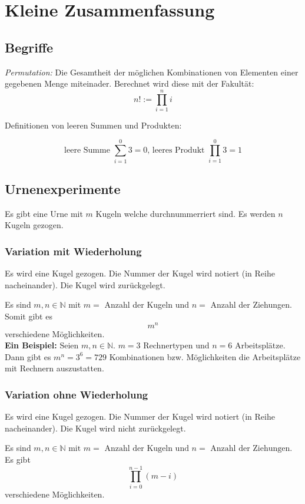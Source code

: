 \documentclass[12pt, twoside]{article}
\newcommand{\N}{\mathbb{N}}
\begin{document}
\section{Kleine Zusammenfassung}
\subsection{Begriffe}
\textit{Permutation:} Die Gesamtheit der möglichen Kombinationen von Elementen einer gegebenen
Menge miteinader. Berechnet wird diese mit der Fakultät:
$$n!:= \prod_{i=1}^{n}i$$

Definitionen von leeren Summen und Produkten:

$$
\text{leere Summe } \sum_{i=1}^{0}3=0 \text{, leeres Produkt } \prod_{i=1}^{0}3=1
$$

\subsection{Urnenexperimente}
Es gibt eine Urne mit $m$ Kugeln welche durchnummerriert sind. Es werden $n$ Kugeln gezogen.
\subsubsection{Variation mit Wiederholung}

Es wird eine Kugel gezogen. Die Nummer der Kugel wird notiert (in Reihe nacheinander). Die Kugel
wird zurückgelegt. 

Es sind $m, n \in \N$ mit $m=$ Anzahl der Kugeln und $n=$ Anzahl der Ziehungen. Somit gibt es
$$
m^n
$$
verschiedene Möglichkeiten. \\

\textbf{Ein Beispiel:} Seien $m, n \in \N$. $m=3$ Rechnertypen und $n=6$ Arbeitsplätze. Dann gibt es $m^n=3^6=729$ Kombinationen bzw. Möglichkeiten
die Arbeitsplätze mit Rechnern auszustatten. \\

\subsubsection{Variation ohne Wiederholung}

Es wird eine Kugel gezogen. Die Nummer der Kugel wird notiert (in Reihe nacheinander). Die Kugel wird nicht
zurückgelegt.

Es sind $m, n \in \N \text{ mit } m= \text{ Anzahl der Kugeln und } n= \text{ Anzahl der Ziehungen}$. Es gibt 
$$
\prod_{i=0}^{n-1}(m-i)
$$
verschiedene Möglichkeiten.
\end{document}

